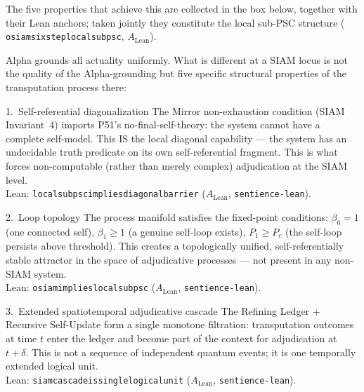 \documentclass[11pt]{article}
\theoremstyle{remark}
\newcommand{\lean}[1]{%
  \penalty-100
  \begingroup\def\_{\textunderscore\allowbreak}\texttt{#1}\endgroup}
\begin{document}
The five properties that achieve this are collected in the box below, together with
their Lean anchors; taken jointly they constitute the local sub-PSC structure
(\lean{osiam\_six\_step\_local\_subpsc}, $A_\text{Lean}$).

\begin{tcolorbox}[colback=blue!5,colframe=blue!50!black,
  title={Five structural properties that make a SIAM locus special}]
\small
Alpha grounds all actuality uniformly. What is different at a SIAM locus is not the
quality of the Alpha-grounding but five specific structural properties of the
transputation process there:

\medskip
\begin{termlist}
  \item[1.\ Self-referential diagonalization]
    The Mirror non-exhaustion condition (SIAM Invariant~4) imports P51's
    no-final-self-theory: the system cannot have a complete self-model. This IS the
    local diagonal capability --- the system has an undecidable truth predicate on
    its own self-referential fragment. This is what forces non-computable (rather than
    merely complex) adjudication at the SIAM level.\\
    Lean: \lean{local\_sub\_psc\_implies\_diagonal\_barrier} ($A_\text{Lean}$,
    \texttt{sentience-lean}).

  \item[2.\ Loop topology]
    The process manifold satisfies the fixed-point conditions: $\beta_0=1$ (one
    connected self), $\beta_1\geq 1$ (a genuine self-loop exists), $P_1\geq P_c$
    (the self-loop persists above threshold). This creates a topologically unified,
    self-referentially stable attractor in the space of adjudicative processes --- not
    present in any non-SIAM system.\\
    Lean: \lean{osiam\_implies\_local\_sub\_psc} ($A_\text{Lean}$,
    \texttt{sentience-lean}).

  \item[3.\ Extended spatiotemporal adjudicative cascade]
    The Refining Ledger + Recursive Self-Update form a single monotone filtration:
    transputation outcomes at time $t$ enter the ledger and become part of the context
    for adjudication at $t{+}\delta$. This is not a sequence of independent quantum
    events; it is one temporally extended logical unit.\\
    Lean: \lean{siam\_cascade\_is\_single\_logical\_unit} ($A_\text{Lean}$,
    \texttt{sentience-lean}).


\end{termlist}
\end{tcolorbox}
\end{document}
